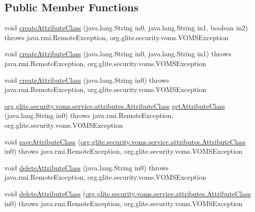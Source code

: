 \subsection*{Public Member Functions}
\begin{DoxyCompactItemize}
\item 
void \hyperlink{classorg_1_1glite_1_1security_1_1voms_1_1service_1_1attributes_1_1VOMSAttributesSoapBindingImpl_afc8f61606f7f4cd380a094782cfac304}{createAttributeClass} (java.lang.String in0, java.lang.String in1, boolean in2)  throws java.rmi.RemoteException, org.glite.security.voms.VOMSException 
\item 
void \hyperlink{classorg_1_1glite_1_1security_1_1voms_1_1service_1_1attributes_1_1VOMSAttributesSoapBindingImpl_a49bdb2e77df4960a58e046dcca70e758}{createAttributeClass} (java.lang.String in0, java.lang.String in1)  throws java.rmi.RemoteException, org.glite.security.voms.VOMSException 
\item 
void \hyperlink{classorg_1_1glite_1_1security_1_1voms_1_1service_1_1attributes_1_1VOMSAttributesSoapBindingImpl_a02af2e477ca75c60141db68f8756e031}{createAttributeClass} (java.lang.String in0)  throws java.rmi.RemoteException, org.glite.security.voms.VOMSException 
\item 
\hyperlink{classorg_1_1glite_1_1security_1_1voms_1_1service_1_1attributes_1_1AttributeClass}{org.glite.security.voms.service.attributes.AttributeClass} \hyperlink{classorg_1_1glite_1_1security_1_1voms_1_1service_1_1attributes_1_1VOMSAttributesSoapBindingImpl_a18ee29036449eb8219c18be0f1e53685}{getAttributeClass} (java.lang.String in0)  throws java.rmi.RemoteException, org.glite.security.voms.VOMSException 
\item 
void \hyperlink{classorg_1_1glite_1_1security_1_1voms_1_1service_1_1attributes_1_1VOMSAttributesSoapBindingImpl_a2c7c104f129390ff1cf425872383a901}{saveAttributeClass} (\hyperlink{classorg_1_1glite_1_1security_1_1voms_1_1service_1_1attributes_1_1AttributeClass}{org.glite.security.voms.service.attributes.AttributeClass} in0)  throws java.rmi.RemoteException, org.glite.security.voms.VOMSException 
\item 
void \hyperlink{classorg_1_1glite_1_1security_1_1voms_1_1service_1_1attributes_1_1VOMSAttributesSoapBindingImpl_ab846175bfd7186f388c5e3667255d7b3}{deleteAttributeClass} (java.lang.String in0)  throws java.rmi.RemoteException, org.glite.security.voms.VOMSException 
\item 
void \hyperlink{classorg_1_1glite_1_1security_1_1voms_1_1service_1_1attributes_1_1VOMSAttributesSoapBindingImpl_a5456d2ea35f23d25d5e79c64552c4539}{deleteAttributeClass} (\hyperlink{classorg_1_1glite_1_1security_1_1voms_1_1service_1_1attributes_1_1AttributeClass}{org.glite.security.voms.service.attributes.AttributeClass} in0)  throws java.rmi.RemoteException, org.glite.security.voms.VOMSException 

\end{DoxyCompactItemize}
